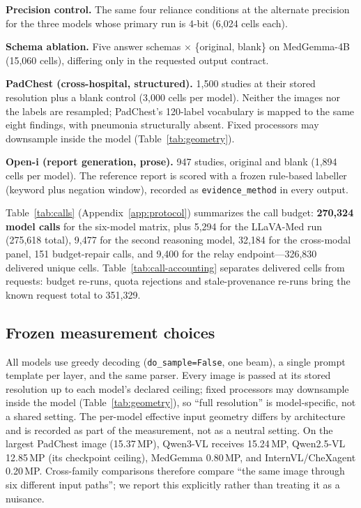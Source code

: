 \textbf{Precision control.} The same four reliance conditions at the alternate precision for the three models whose primary run is 4-bit (6,024 cells each).

\textbf{Schema ablation.} Five answer schemas $\times$ \{original, blank\} on MedGemma-4B (15,060 cells), differing only in the requested output contract.

\textbf{PadChest (cross-hospital, structured).} 1,500 studies at their stored resolution plus a blank control (3,000 cells per model). Neither the images nor the labels are resampled; PadChest's 120-label vocabulary is mapped to the same eight findings, with pneumonia structurally absent. Fixed processors may downsample inside the model (Table~\ref{tab:geometry}).

\textbf{Open-i (report generation, prose).} 947 studies, original and blank (1,894 cells per model). The reference report is scored with a frozen rule-based labeller (keyword plus negation window), recorded as \texttt{evidence\_method} in every output.

Table~\ref{tab:calls} (Appendix~\ref{app:protocol}) summarizes the call budget: \textbf{270,324 model calls} for the six-model matrix, plus 5,294 for the LLaVA-Med run (275,618 total), 9,477 for the second reasoning model, 32,184 for the cross-modal panel, 151 budget-repair calls, and 9,400 for the relay endpoint---326,830 delivered unique cells. Table~\ref{tab:call-accounting} separates delivered cells from requests: budget re-runs, quota rejections and stale-provenance re-runs bring the known request total to 351,329.

\subsection{Frozen measurement choices}

All models use greedy decoding (\texttt{do\_sample=False}, one beam), a single prompt template per layer, and the same parser. Every image is passed at its stored resolution up to each model's declared ceiling; fixed processors may downsample inside the model (Table~\ref{tab:geometry}), so ``full resolution'' is model-specific, not a shared setting. The per-model effective input geometry differs by architecture and is recorded as part of the measurement, not as a neutral setting. On the largest PadChest image (15.37\,MP), Qwen3-VL receives 15.24\,MP, Qwen2.5-VL 12.85\,MP (its checkpoint ceiling), MedGemma 0.80\,MP, and InternVL/CheXagent 0.20\,MP. Cross-family comparisons therefore compare ``the same image through six different input paths''; we report this explicitly rather than treating it as a nuisance.

